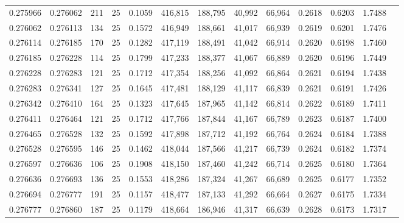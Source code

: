 \begin{tabular}{rrrrrrrrrrrrr}
0.275966 & 0.276062 &   211 &  25 &                                     0.1059 & 416,815 & 188,795 &  40,992 &  66,964 & 0.2618 & 0.6203 & 1.7488 \\
0.276062 & 0.276113 &   134 &  25 &                                     0.1572 & 416,949 & 188,661 &  41,017 &  66,939 & 0.2619 & 0.6201 & 1.7476 \\
0.276114 & 0.276185 &   170 &  25 &                                     0.1282 & 417,119 & 188,491 &  41,042 &  66,914 & 0.2620 & 0.6198 & 1.7460 \\
0.276185 & 0.276228 &   114 &  25 &                                     0.1799 & 417,233 & 188,377 &  41,067 &  66,889 & 0.2620 & 0.6196 & 1.7449 \\
0.276228 & 0.276283 &   121 &  25 &                                     0.1712 & 417,354 & 188,256 &  41,092 &  66,864 & 0.2621 & 0.6194 & 1.7438 \\
0.276283 & 0.276341 &   127 &  25 &                                     0.1645 & 417,481 & 188,129 &  41,117 &  66,839 & 0.2621 & 0.6191 & 1.7426 \\
0.276342 & 0.276410 &   164 &  25 &                                     0.1323 & 417,645 & 187,965 &  41,142 &  66,814 & 0.2622 & 0.6189 & 1.7411 \\
0.276411 & 0.276464 &   121 &  25 &                                     0.1712 & 417,766 & 187,844 &  41,167 &  66,789 & 0.2623 & 0.6187 & 1.7400 \\
0.276465 & 0.276528 &   132 &  25 &                                     0.1592 & 417,898 & 187,712 &  41,192 &  66,764 & 0.2624 & 0.6184 & 1.7388 \\
0.276528 & 0.276595 &   146 &  25 &                                     0.1462 & 418,044 & 187,566 &  41,217 &  66,739 & 0.2624 & 0.6182 & 1.7374 \\
0.276597 & 0.276636 &   106 &  25 &                                     0.1908 & 418,150 & 187,460 &  41,242 &  66,714 & 0.2625 & 0.6180 & 1.7364 \\
0.276636 & 0.276693 &   136 &  25 &                                     0.1553 & 418,286 & 187,324 &  41,267 &  66,689 & 0.2625 & 0.6177 & 1.7352 \\
0.276694 & 0.276777 &   191 &  25 &                                     0.1157 & 418,477 & 187,133 &  41,292 &  66,664 & 0.2627 & 0.6175 & 1.7334 \\
0.276777 & 0.276860 &   187 &  25 &                                     0.1179 & 418,664 & 186,946 &  41,317 &  66,639 & 0.2628 & 0.6173 & 1.7317 \\

\end{tabular}
